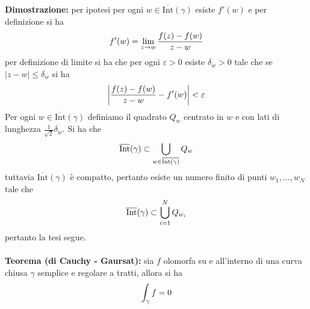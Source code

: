 \documentclass{article}
\begin{document}
\textbf{Dimostrazione:} per ipotesi per ogni $w \in \overline{\mathrm{Int}}(\gamma)$ esiste $f'(w)$ e per definizione si ha
\begin{gather}
    f'(w) = \lim_{z \rightarrow w}\frac{f(z) - f(w)}{z - w} \notag
\end{gather}
per definizione di limite si ha che per ogni $\varepsilon > 0$ esiste $\delta_w > 0$ tale che se $|z - w| \leq \delta_w$ si ha
\begin{gather}
    \left|\frac{f(z) - f(w)}{z - w} - f'(w)\right| < \varepsilon \notag
\end{gather}
Per ogni $w \in \overline{\mathrm{Int}}(\gamma)$ definiamo il quadrato $Q_w$ centrato in $w$ e con lati di lunghezza $\frac{1}{\sqrt{2}}\delta_w$. Si ha che
\begin{gather}
    \overline{\mathrm{Int}}(\gamma) \subset \bigcup_{w \in \overline{\mathrm{Int}(\gamma)}}Q_w \notag
\end{gather}
tuttavia $\overline{\mathrm{Int}}(\gamma)$ è compatto, pertanto esiste un numero finito di punti $w_1, \dots, w_N$ tale che
\begin{gather}
    \overline{\mathrm{Int}}(\gamma) \subset \bigcup_{i = 1}^N Q_{w_i} \notag
\end{gather}
pertanto la tesi segue. \\ \\
\textbf{Teorema (di Cauchy - Gaursat):} sia $f$ olomorfa su e all'interno di una curva chiusa $\gamma$ semplice e regolare a tratti, allora si ha
\begin{gather}
    \int_\gamma f = 0 \notag
\end{gather}
\end{document}
